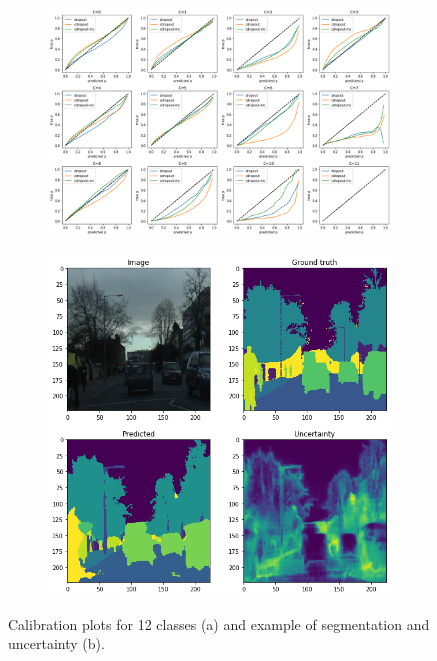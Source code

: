 \documentclass{article}
\begin{document}
\begin{figure}[!h]
\centering
\begin{subfigure}{.5\textwidth}
  \centering
  \includegraphics[width=\linewidth]{calibration_plots.png}
\end{subfigure}%
\begin{subfigure}{.5\textwidth}
  \centering
  \includegraphics[width=0.7\linewidth]{preview_results.png}
\end{subfigure}
\caption{Calibration plots for 12 classes (a) and example of segmentation and uncertainty (b).}
\label{fig:calib_ex}
\end{figure}
\end{document}

